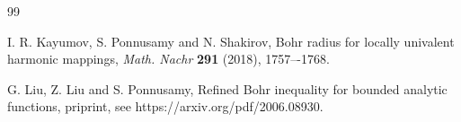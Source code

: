 \documentclass[a4paper,12pt]{amsart}
\theoremstyle{plain}
\theoremstyle{definition}
\begin{document}
\begin{thebibliography}{99}
	
	 {\sc I. R. Kayumov}, {\sc S. Ponnusamy} and {\sc N. Shakirov}, Bohr radius for locally univalent harmonic mappings, {\it Math. Nachr} {\bf 291} (2018), 1757–-1768.
	
	
	
	
	
	
	
	
	
	
	 {\sc G. Liu}, {\sc Z. Liu} and {\sc S. Ponnusamy}, Refined Bohr inequality for bounded analytic functions, priprint, see https://arxiv.org/pdf/2006.08930.
	

\end{thebibliography}
\end{document}
